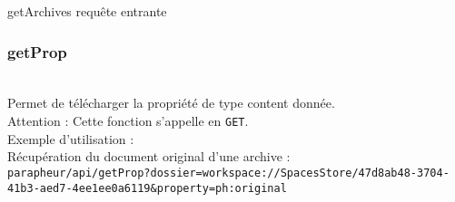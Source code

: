 \begin{codesnippet}
\inputminted[frame=single,linenos,fontsize=\footnotesize]{javascript}{extraits/getArchives_in.js}
\caption{getArchives requête entrante}
\label{snip:getArchives_in}
\end{codesnippet}

\subsubsection{getProp}
\\

Permet de télécharger la propriété de type content donnée.\\
Attention : Cette fonction s'appelle en \verb|GET|.\\

Exemple d'utilisation :\\
Récupération du document original d'une archive :\\
\verb|parapheur/api/getProp?dossier=workspace://SpacesStore/47d8ab48-3704-41b3-aed7-4ee1ee0a6119&property=ph:original|

